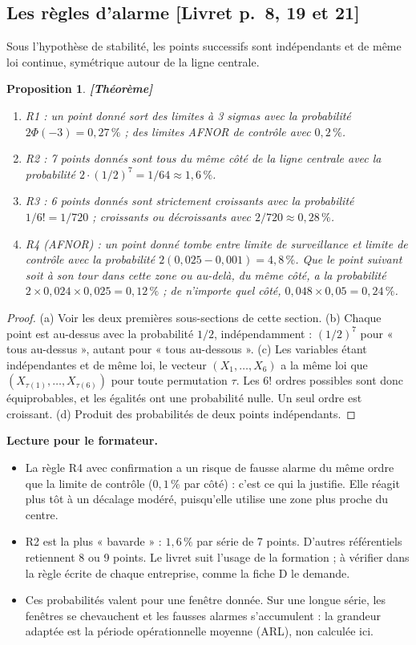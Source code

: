 \documentclass[11pt,a4paper]{article}
\theoremstyle{tq}
\newtheorem{prop}{Proposition}
\theoremstyle{remark}
\newcommand{\thm}{\textcolor{vertTQ}{\textbf{[Théorème]}}}
\newcommand{\liv}[1]{\textcolor{uimmblue}{\small[Livret p.~#1]}}
\begin{document}
\subsection{Les règles d'alarme \liv{8, 19 et 21}}
Sous l'hypothèse de stabilité, les points successifs sont indépendants et de même loi continue, symétrique autour de la ligne centrale.
\begin{prop}\thm{}
\begin{enumerate}[nosep,label=(\alph*)]
\item R1 : un point donné sort des limites à 3 sigmas avec la probabilité $2\Phi(-3)=0{,}27\,\%$ ; des limites AFNOR de contrôle avec $0{,}2\,\%$.
\item R2 : 7 points donnés sont tous du même côté de la ligne centrale avec la probabilité $2\cdot(1/2)^7=1/64\approx1{,}6\,\%$.
\item R3 : 6 points donnés sont strictement croissants avec la probabilité $1/6!=1/720$ ; croissants ou décroissants avec $2/720\approx0{,}28\,\%$.
\item R4 (AFNOR) : un point donné tombe entre limite de surveillance et limite de contrôle avec la probabilité $2(0{,}025-0{,}001)=4{,}8\,\%$. Que le point suivant soit à son tour dans cette zone ou au-delà, du même côté, a la probabilité $2\times0{,}024\times0{,}025=0{,}12\,\%$ ; de n'importe quel côté, $0{,}048\times0{,}05=0{,}24\,\%$.
\end{enumerate}
\end{prop}
\begin{proof}
(a) Voir les deux premières sous-sections de cette section. (b) Chaque point est au-dessus avec la probabilité $1/2$, indépendamment : $(1/2)^7$ pour « tous au-dessus », autant pour « tous au-dessous ». (c) Les variables étant indépendantes et de même loi, le vecteur $(X_1,\dots,X_6)$ a la même loi que $(X_{\tau(1)},\dots,X_{\tau(6)})$ pour toute permutation $\tau$. Les $6!$ ordres possibles sont donc équiprobables, et les égalités ont une probabilité nulle. Un seul ordre est croissant. (d) Produit des probabilités de deux points indépendants.
\end{proof}
\textbf{Lecture pour le formateur.}
\begin{itemize}[nosep,leftmargin=1.2em]
\item La règle R4 avec confirmation a un risque de fausse alarme du même ordre que la limite de contrôle ($0{,}1\,\%$ par côté) : c'est ce qui la justifie. Elle réagit plus tôt à un décalage modéré, puisqu'elle utilise une zone plus proche du centre.
\item R2 est la plus « bavarde » : $1{,}6\,\%$ par série de 7 points. D'autres référentiels retiennent 8 ou 9 points. Le livret suit l'usage de la formation ; à vérifier dans la règle écrite de chaque entreprise, comme la fiche D le demande.
\item Ces probabilités valent pour une fenêtre donnée. Sur une longue série, les fenêtres se chevauchent et les fausses alarmes s'accumulent : la grandeur adaptée est la période opérationnelle moyenne (ARL), non calculée ici.
\end{itemize}
\end{document}
